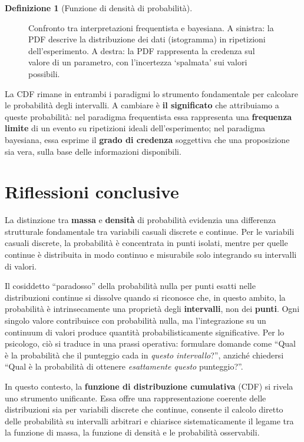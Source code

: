 \documentclass[
  italian,
  letterpaper,
  a4paper,
  11pt,
  open=any]{scrbook}
\theoremstyle{plain}
\theoremstyle{definition}
\theoremstyle{definition}
\newtheorem{definition}{Definizione}[chapter]
\theoremstyle{remark}
\begin{document}
\begin{definition}[Funzione di densità di
probabilità]
\begin{figure}[H]
{}

\caption{\label{fig-freq-vs-bayes}Confronto tra interpretazioni
frequentista e bayesiana. A sinistra: la PDF descrive la distribuzione
dei dati (istogramma) in ripetizioni dell'esperimento. A destra: la PDF
rappresenta la credenza sul valore di un parametro, con l'incertezza
`spalmata' sui valori possibili.}

\end{figure}%

La CDF rimane in entrambi i paradigmi lo strumento fondamentale per
calcolare le probabilità degli intervalli. A cambiare è \textbf{il
significato} che attribuiamo a queste probabilità: nel paradigma
frequentista essa rappresenta una \textbf{frequenza limite} di un evento
su ripetizioni ideali dell'esperimento; nel paradigma bayesiana, essa
esprime il \textbf{grado di credenza} soggettiva che una proposizione
sia vera, sulla base delle informazioni disponibili.

\section*{Riflessioni conclusive}\label{riflessioni-conclusive-6}


La distinzione tra \textbf{massa} e \textbf{densità} di probabilità
evidenzia una differenza strutturale fondamentale tra variabili casuali
discrete e continue. Per le variabili casuali discrete, la probabilità è
concentrata in punti isolati, mentre per quelle continue è distribuita
in modo continuo e misurabile solo integrando su intervalli di valori.

Il cosiddetto ``paradosso'' della probabilità nulla per punti esatti
nelle distribuzioni continue si dissolve quando si riconosce che, in
questo ambito, la probabilità è intrinsecamente una proprietà degli
\textbf{intervalli}, non dei \textbf{punti}. Ogni singolo valore
contribuisce con probabilità nulla, ma l'integrazione su un continuum di
valori produce quantità probabilisticamente significative. Per lo
psicologo, ciò si traduce in una prassi operativa: formulare domande
come ``Qual è la probabilità che il punteggio cada in \emph{questo
intervallo}?'', anziché chiedersi ``Qual è la probabilità di ottenere
\emph{esattamente questo} punteggio?''.

In questo contesto, la \textbf{funzione di distribuzione cumulativa}
(CDF) si rivela uno strumento unificante. Essa offre una
rappresentazione coerente delle distribuzioni sia per variabili discrete
che continue, consente il calcolo diretto delle probabilità su
intervalli arbitrari e chiarisce sistematicamente il legame tra la
funzione di massa, la funzione di densità e le probabilità osservabili.


\end{definition}
\end{document}
